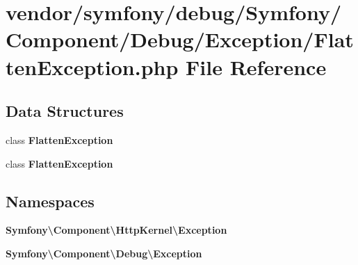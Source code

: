 \section{vendor/symfony/debug/\+Symfony/\+Component/\+Debug/\+Exception/\+Flatten\+Exception.php File Reference}
\label{debug_2_symfony_2_component_2_debug_2_exception_2_flatten_exception_8php}
\subsection*{Data Structures}
\begin{DoxyCompactItemize}
\item 
class {\bf Flatten\+Exception}
\item 
class {\bf Flatten\+Exception}
\end{DoxyCompactItemize}
\subsection*{Namespaces}
\begin{DoxyCompactItemize}
\item 
 {\bf Symfony\textbackslash{}\+Component\textbackslash{}\+Http\+Kernel\textbackslash{}\+Exception}
\item 
 {\bf Symfony\textbackslash{}\+Component\textbackslash{}\+Debug\textbackslash{}\+Exception}
\end{DoxyCompactItemize}
